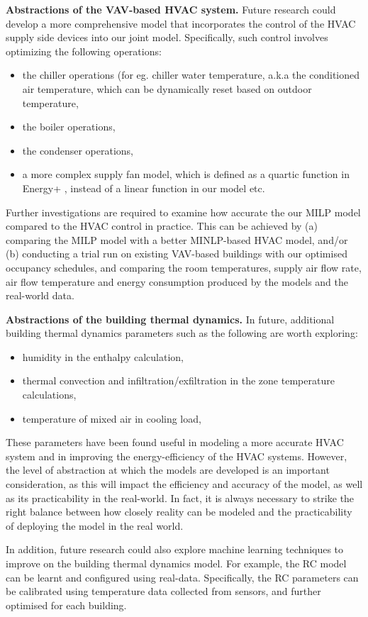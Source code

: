\textbf{Abstractions of the VAV-based HVAC system.} Future research could develop a more comprehensive model that incorporates the control of the HVAC supply side devices into our joint model. Specifically, such control involves optimizing the following operations:
\begin{itemize}
	\item the chiller operations (for eg. chiller water temperature, a.k.a the conditioned air temperature, which can be dynamically reset based on outdoor temperature, 
	\item the boiler operations,
	\item the condenser operations,
	\item a more complex supply fan model, which is defined as a quartic function in Energy+ \citep{crawley2000energyplus}, instead of a linear function in our model etc.
\end{itemize}

Further investigations are required to examine how accurate the our MILP model compared to the HVAC control in practice. This can be achieved by (a) comparing the MILP model with a better MINLP-based HVAC model, and/or (b) conducting a trial run on existing VAV-based buildings with our optimised occupancy schedules, and comparing the room temperatures, supply air flow rate, air flow temperature and energy consumption produced by the models and the real-world data. %

\textbf{Abstractions of the building thermal dynamics.} In future, additional building thermal dynamics parameters such as the following are worth exploring: 
\begin{itemize}
	\item humidity in the enthalpy calculation,	
	\item thermal convection and infiltration/exfiltration in the zone temperature calculations,	
	\item temperature of mixed air in cooling load,		
\end{itemize}
These parameters have been found useful in modeling a more accurate HVAC system and in improving the energy-efficiency of the HVAC systems. However, the level of abstraction at which the models are developed is an important consideration, as this will impact the efficiency and accuracy of the model, as well as its practicability in the real-world. In fact, it is always necessary to strike the right balance between how closely reality can be modeled and the practicability of deploying the model in the real world.

In addition, future research could also explore machine learning techniques to improve on the building thermal dynamics model. For example, the RC model can be learnt and configured using real-data. Specifically, the RC parameters can be calibrated using temperature data collected from sensors, and further optimised for each building. 






